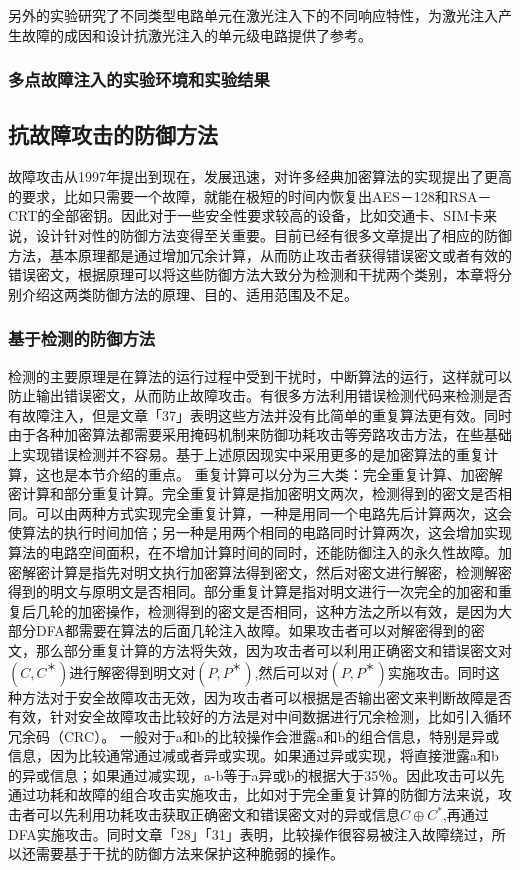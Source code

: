\documentclass[a4paper,12pt]{article}
\begin{document}
\begin{CJK}{UTF8}{gkai}
另外的实验研究了不同类型电路单元在激光注入下的不同响应特性，为激光注入产生故障的成因和设计抗激光注入的单元级电路提供了参考。
\subsubsection{多点故障注入的实验环境和实验结果}
\subsection{抗故障攻击的防御方法}
故障攻击从1997年提出到现在，发展迅速，对许多经典加密算法的实现提出了更高的要求，比如只需要一个故障，就能在极短的时间内恢复出AES－128和RSA－CRT的全部密钥。因此对于一些安全性要求较高的设备，比如交通卡、SIM卡来说，设计针对性的防御方法变得至关重要。目前已经有很多文章提出了相应的防御方法，基本原理都是通过增加冗余计算，从而防止攻击者获得错误密文或者有效的错误密文，根据原理可以将这些防御方法大致分为检测和干扰两个类别，本章将分别介绍这两类防御方法的原理、目的、适用范围及不足。
\subsubsection{基于检测的防御方法}
检测的主要原理是在算法的运行过程中受到干扰时，中断算法的运行，这样就可以防止输出错误密文，从而防止故障攻击。有很多方法利用错误检测代码来检测是否有故障注入，但是文章「37」表明这些方法并没有比简单的重复算法更有效。同时由于各种加密算法都需要采用掩码机制来防御功耗攻击等旁路攻击方法，在些基础上实现错误检测并不容易。基于上述原因现实中采用更多的是加密算法的重复计算，这也是本节介绍的重点。
重复计算可以分为三大类：完全重复计算、加密解密计算和部分重复计算。完全重复计算是指加密明文两次，检测得到的密文是否相同。可以由两种方式实现完全重复计算，一种是用同一个电路先后计算两次，这会使算法的执行时间加倍；另一种是用两个相同的电路同时计算两次，这会增加实现算法的电路空间面积，在不增加计算时间的同时，还能防御注入的永久性故障。加密解密计算是指先对明文执行加密算法得到密文，然后对密文进行解密，检测解密得到的明文与原明文是否相同。部分重复计算是指对明文进行一次完全的加密和重复后几轮的加密操作，检测得到的密文是否相同，这种方法之所以有效，是因为大部分DFA都需要在算法的后面几轮注入故障。如果攻击者可以对解密得到的密文，那么部分重复计算的方法将失效，因为攻击者可以利用正确密文和错误密文对$(C,C^＊)$进行解密得到明文对$(P,P^＊)$,然后可以对$(P,P^＊)$实施攻击。同时这种方法对于安全故障攻击无效，因为攻击者可以根据是否输出密文来判断故障是否有效，针对安全故障攻击比较好的方法是对中间数据进行冗余检测，比如引入循环冗余码（CRC）。
一般对于a和b的比较操作会泄露a和b的组合信息，特别是异或信息，因为比较通常通过减或者异或实现。如果通过异或实现，将直接泄露a和b的异或信息；如果通过减实现，a-b等于a异或b的根据大于35％。因此攻击可以先通过功耗和故障的组合攻击实施攻击，比如对于完全重复计算的防御方法来说，攻击者可以先利用功耗攻击获取正确密文和错误密文对的异或信息$C \oplus C^*$,再通过DFA实施攻击。同时文章「28」「31」表明，比较操作很容易被注入故障绕过，所以还需要基于干扰的防御方法来保护这种脆弱的操作。


\end{CJK}
\end{document}
